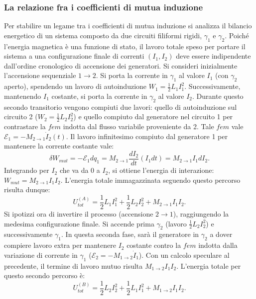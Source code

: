 \documentclass[a4paper,11pt]{report}
\begin{document}
\subsubsection{La relazione fra i coefficienti di mutua induzione}
Per stabilire un legame tra i coefficienti di mutua induzione si analizza il bilancio energetico di un sistema composto da due circuiti filiformi rigidi, $\gamma_1$ e $\gamma_2$. Poiché l'energia magnetica è una funzione di stato, il lavoro totale speso per portare il sistema a una configurazione finale di correnti $(I_1, I_2)$ deve essere indipendente dall'ordine cronologico di accensione dei generatori.
Si consideri inizialmente l'accensione sequenziale $1 \rightarrow 2$. Si porta la corrente in $\gamma_1$ al valore $I_1$ (con $\gamma_2$ aperto), spendendo un lavoro di autoinduzione $W_1 = \frac{1}{2}L_1I_1^2$. Successivamente, mantenendo $I_1$ costante, si porta la corrente in $\gamma_2$ al valore $I_2$. Durante questo secondo transitorio vengono compiuti due lavori: quello di autoinduzione sul circuito 2 ($W_2 = \frac{1}{2}L_2I_2^2$) e quello compiuto dal generatore nel circuito 1 per contrastare la $fem$ indotta dal flusso variabile proveniente da 2.
Tale $fem$ vale $\mathcal{E}_1 = -M_{2\rightarrow 1}\dot{I}_2(t)$. Il lavoro infinitesimo compiuto dal generatore 1 per mantenere la corrente costante vale:
\begin{equation}
\delta W_{mut} = -\mathcal{E}_1 dq_1 = M_{2\rightarrow 1}\frac{dI_2}{dt} (I_1 dt) = M_{2\rightarrow 1}I_1 dI_2.
\end{equation}
Integrando per $I_2$ che va da $0$ a $I_2$, si ottiene l'energia di interazione: $W_{mut} = M_{2\rightarrow 1}I_1I_2$.
L'energia totale immagazzinata seguendo questo percorso risulta dunque:
\begin{equation}
U_{tot}^{(A)} = \frac{1}{2}L_1I_1^2 + \frac{1}{2}L_2I_2^2 + M_{2\rightarrow 1}I_1I_2.
\end{equation}
Si ipotizzi ora di invertire il processo (accensione $2 \rightarrow 1$), raggiungendo la medesima configurazione finale. Si accende prima $\gamma_2$ (lavoro $\frac{1}{2}L_2I_2^2$) e successivamente $\gamma_1$. In questa seconda fase, sarà il generatore in $\gamma_2$ a dover compiere lavoro extra per mantenere $I_2$ costante contro la $fem$ indotta dalla variazione di corrente in $\gamma_1$ ($\mathcal{E}_2 = -M_{1\rightarrow 2}\dot{I}_1$). Con un calcolo speculare al precedente, il termine di lavoro mutuo risulta $M_{1\rightarrow 2}I_1I_2$.
L'energia totale per questo secondo percorso è:
\begin{equation}
U_{tot}^{(B)} = \frac{1}{2}L_2I_2^2 + \frac{1}{2}L_1I_1^2 + M_{1\rightarrow 2}I_1I_2.
\end{equation}
\end{document}
